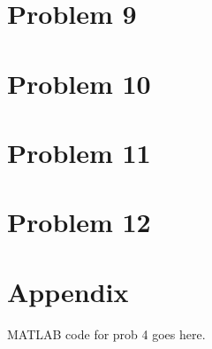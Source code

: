 \documentclass[10pt]{article}
\begin{document}
\section{Problem 9}
\section{Problem 10}
\section{Problem 11}
\section{Problem 12}

\section*{Appendix}
MATLAB code for prob 4 goes here.
\end{document}
